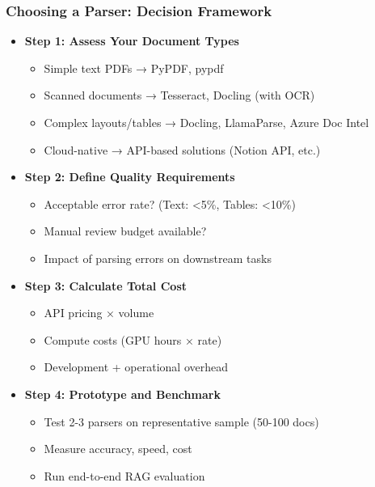 \begin{frame}[fragile]\frametitle{Choosing a Parser: Decision Framework}
      \begin{itemize}
        \item \textbf{Step 1: Assess Your Document Types}
        \begin{itemize}
            \item Simple text PDFs → PyPDF, pypdf
            \item Scanned documents → Tesseract, Docling (with OCR)
            \item Complex layouts/tables → Docling, LlamaParse, Azure Doc Intel
            \item Cloud-native → API-based solutions (Notion API, etc.)
        \end{itemize}
        \item \textbf{Step 2: Define Quality Requirements}
        \begin{itemize}
            \item Acceptable error rate? (Text: <5\%, Tables: <10\%)
            \item Manual review budget available?
            \item Impact of parsing errors on downstream tasks
        \end{itemize}
        \item \textbf{Step 3: Calculate Total Cost}
        \begin{itemize}
            \item API pricing × volume
            \item Compute costs (GPU hours × rate)
            \item Development + operational overhead
        \end{itemize}
        \item \textbf{Step 4: Prototype and Benchmark}
        \begin{itemize}
            \item Test 2-3 parsers on representative sample (50-100 docs)
            \item Measure accuracy, speed, cost
            \item Run end-to-end RAG evaluation
        \end{itemize}
      \end{itemize}
\end{frame}